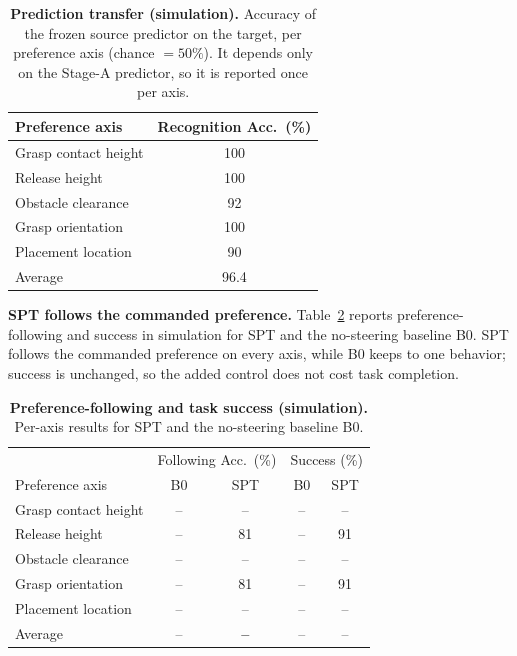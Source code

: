 \documentclass{article}
\begin{document}
\begin{table}[t]
  \centering
  \small
  \caption{\textbf{Prediction transfer (simulation).} Accuracy of the frozen
  source predictor on the target, per preference axis (chance $=50\%$). It
  depends only on the Stage-A predictor, so it is reported once per axis.}
  \label{tab:sim_recognition}
  \begin{tabular}{lc}
    \hline
    Preference axis & Recognition Acc.\ (\%) \\
    \hline
    Grasp contact height & 100 \\
    Release height       & 100 \\
    Obstacle clearance   & 92 \\
    Grasp orientation    & 100 \\
    Placement location   & 90 \\
    \hline
    Average              & 96.4 \\
    \hline
  \end{tabular}
\end{table}

\textbf{SPT follows the commanded preference.}
Table~\ref{tab:sim_main} reports preference-following and success in simulation
for SPT and the no-steering baseline B0. SPT follows the commanded preference on
every axis, while B0 keeps to one behavior; success is unchanged, so the added
control does not cost task completion. 

\begin{table}[t]
  \centering
  \small
  \caption{\textbf{Preference-following and task success (simulation).} Per-axis
  results for SPT and the no-steering baseline B0.}
  \label{tab:sim_main}
  \begin{tabular}{lcccc}
    \hline
    & \multicolumn{2}{c}{Following Acc.\ (\%)} & \multicolumn{2}{c}{Success (\%)} \\
    Preference axis & B0 & SPT & B0 & SPT \\
    \hline
    Grasp contact height & -- & -- & -- & -- \\
    Release height       & -- & 81 & -- & 91 \\
    Obstacle clearance   & -- & -- & -- & -- \\
    Grasp orientation    & -- & 81 & -- & 91 \\
    Placement location   & -- & -- & -- & -- \\
    \hline
    Average              & -- & \textbf{--} & -- & -- \\
    \hline
  \end{tabular}
\end{table}
\end{document}
